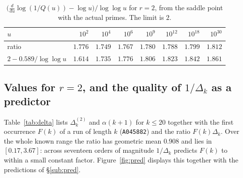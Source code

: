 \documentclass[10pt,a4paper]{amsart}
\numberwithin{equation}{section}
\begin{document}
\begin{table}[ht]
\caption{$\bigl(\frac{d}{du}\log(1/Q(u))-\log u\bigr)/\log\log u$ for $r=2$, from the
saddle point with the actual primes. The limit is $2$.}
\label{tab:extrap}
\begin{tabular}{lrrrrrrr}
\toprule
$u$ & $10^{2}$ & $10^{4}$ & $10^{6}$ & $10^{9}$ & $10^{12}$ & $10^{18}$ & $10^{30}$\\
\midrule
ratio & $1.776$ & $1.749$ & $1.767$ & $1.780$ & $1.788$ & $1.799$ & $1.812$\\
$2-0.589/\log\log u$ & $1.614$ & $1.735$ & $1.776$ & $1.806$ & $1.823$ & $1.842$ & $1.861$\\
\bottomrule
\end{tabular}
\end{table}

\subsection{Values for $r=2$, and the quality of $1/\Delta_k$ as a predictor}
Table~\ref{tab:delta} lists $\Delta^{(2)}_k$ and $\alpha(k+1)$ for $k\le20$ together with
the first occurrence $F(k)$ of a run of length $k$ (\texttt{A045882}) and the ratio
$F(k)\Delta_k$. Over the whole known range the ratio has geometric mean $0.908$ and lies in
$[0.17,3.67]$: across seventeen orders of magnitude $1/\Delta_k$ predicts $F(k)$ to within
a small constant factor. Figure~\ref{fig:pred} displays this together with the predictions
of \S\ref{sub:pred}.
\end{document}

